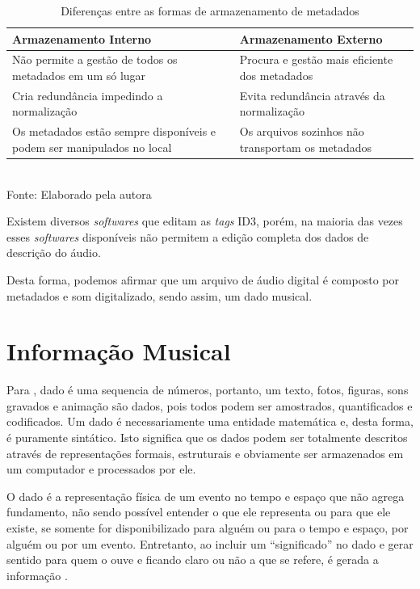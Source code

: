 \begin{table}[ht]
    \centering
    \caption{Diferenças entre as formas de armazenamento de metadados}
    \begin{tabular}{p{6cm}|p{6cm}}
    \hline
        \textbf{Armazenamento Interno} & \textbf{Armazenamento Externo} \\
    \hline
        Não permite a gestão de todos os metadados em um só lugar & Procura e gestão mais eficiente dos metadados \\
    \hline
        Cria redundância impedindo a normalização & Evita redundância através da normalização \\
    \hline
        Os metadados estão sempre disponíveis e podem ser manipulados no local & Os arquivos sozinhos não transportam os metadados \\
    \hline
    \end{tabular}
    \label{tab:diferencasArmazenamentoMetadados}
    \\Fonte: Elaborado pela autora
\end{table}

Existem diversos \textit{softwares} que editam as \textit{tags} ID3, porém, na maioria das vezes esses \textit{softwares} disponíveis não permitem a edição completa dos dados de descrição do áudio.

Desta forma, podemos afirmar que um arquivo de áudio digital é composto por metadados e som digitalizado, sendo assim, um dado musical.

\section{Informação Musical} \label{sec:informacao-musical}
Para , dado é uma sequencia de números, portanto, um texto, fotos, figuras, sons gravados e animação são dados, pois todos podem ser amostrados, quantificados e codificados. Um dado é necessariamente uma entidade matemática e, desta forma, é puramente sintático. Isto significa que os dados podem ser totalmente descritos através de representações formais, estruturais e obviamente ser armazenados em um computador e processados por ele.

O dado é a representação física de um evento no tempo e espaço que não agrega fundamento, não sendo possível entender o que ele representa ou para que ele existe, se somente for disponibilizado para alguém ou para o tempo e espaço, por alguém ou por um evento.
Entretanto, ao incluir um “significado” no dado e gerar sentido para quem o ouve e ficando claro ou não a que se refere, é gerada a informação \cite{rafael2013}.

